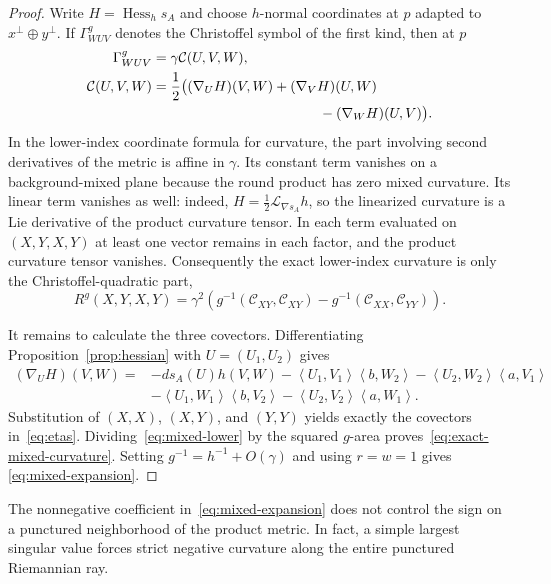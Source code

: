 \documentclass[11pt]{amsart}
\theoremstyle{definition}
\theoremstyle{remark}
\DeclareMathOperator{\Hess}{Hess}
\newcommand{\ip}[2]{\left\langle #1,#2\right\rangle}
\begin{document}
\begin{proof}
Write $H=\Hess_hs_A$ and choose $h$-normal coordinates at $p$ adapted
to $x^\perp\oplus y^\perp$.  If $\Gamma^g_{WUV}$ denotes the
Christoffel symbol of the first kind, then at $p$
\[
 \begin{aligned}
  \Gamma^g_{WUV}&=\gamma\mathcal C(U,V,W),\\
  \mathcal C(U,V,W)
  &=\frac12\big((\nabla_UH)(V,W)+(\nabla_VH)(U,W)\\
  &\hspace{42mm}-(\nabla_WH)(U,V)\big).
 \end{aligned}
\]
In the lower-index coordinate formula for curvature, the part involving
second derivatives of the metric is affine in $\gamma$.  Its constant
term vanishes on a background-mixed plane because the round product has
zero mixed curvature.  Its linear term vanishes as well: indeed,
$H=\frac12\mathcal L_{\nabla s_A}h$, so the linearized curvature is a
Lie derivative of the product curvature tensor.  In each term evaluated
on $(X,Y,X,Y)$ at least one vector remains in each factor, and the
product curvature tensor vanishes.  Consequently the exact lower-index
curvature is only the Christoffel-quadratic part,
\begin{equation}\label{eq:mixed-lower}
 R^g(X,Y,X,Y)=\gamma^2\left(
  g^{-1}(\mathcal C_{XY},\mathcal C_{XY})
  -g^{-1}(\mathcal C_{XX},\mathcal C_{YY})\right).
\end{equation}

It remains to calculate the three covectors.  Differentiating
Proposition~\ref{prop:hessian} with $U=(U_1,U_2)$ gives
\begin{align*}
 (\nabla_UH)(V,W)={}&-ds_A(U)h(V,W)
 -\ip{U_1}{V_1}\ip{b}{W_2}
 -\ip{U_2}{W_2}\ip{a}{V_1}\\
 &-\ip{U_1}{W_1}\ip{b}{V_2}
 -\ip{U_2}{V_2}\ip{a}{W_1}.
\end{align*}
Substitution of $(X,X)$, $(X,Y)$, and $(Y,Y)$ yields exactly the
covectors in~\eqref{eq:etas}.  Dividing~\eqref{eq:mixed-lower} by the
squared $g$-area proves~\eqref{eq:exact-mixed-curvature}.  Setting
$g^{-1}=h^{-1}+O(\gamma)$ and using $r=w=1$ gives
\eqref{eq:mixed-expansion}.
\end{proof}

The nonnegative coefficient in~\eqref{eq:mixed-expansion} does not
control the sign on a punctured neighborhood of the product metric.
In fact, a simple largest singular value forces strict negative
curvature along the entire punctured Riemannian ray.
\end{document}
